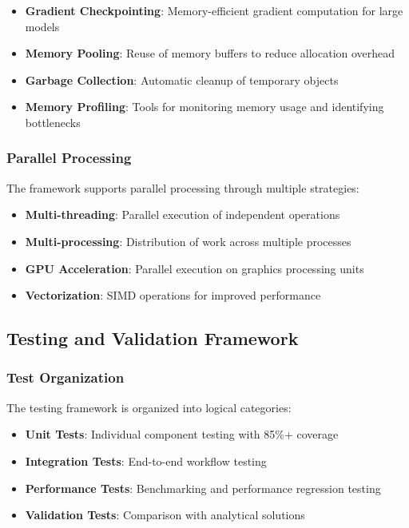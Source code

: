 \begin{itemize}
    \item \textbf{Gradient Checkpointing}: Memory-efficient gradient computation for large models
    \item \textbf{Memory Pooling}: Reuse of memory buffers to reduce allocation overhead
    \item \textbf{Garbage Collection}: Automatic cleanup of temporary objects
    \item \textbf{Memory Profiling}: Tools for monitoring memory usage and identifying bottlenecks
\end{itemize}

\subsubsection{Parallel Processing}

The framework supports parallel processing through multiple strategies:

\begin{itemize}
    \item \textbf{Multi-threading}: Parallel execution of independent operations
    \item \textbf{Multi-processing}: Distribution of work across multiple processes
    \item \textbf{GPU Acceleration}: Parallel execution on graphics processing units
    \item \textbf{Vectorization}: SIMD operations for improved performance
\end{itemize}

\subsection{Testing and Validation Framework}

\subsubsection{Test Organization}

The testing framework is organized into logical categories:

\begin{itemize}
    \item \textbf{Unit Tests}: Individual component testing with 85\%+ coverage
    \item \textbf{Integration Tests}: End-to-end workflow testing
    \item \textbf{Performance Tests}: Benchmarking and performance regression testing
    \item \textbf{Validation Tests}: Comparison with analytical solutions
\end{itemize}

